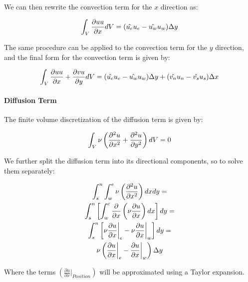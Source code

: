 We can then rewrite the convection term for the $x$ direction as:

\begin{equation}
    \int_{V} \frac{\partial u u}{\partial x} \space dV = (\hat{u_e} u_e - \hat{u_w} u_w) \Delta y
\end{equation}

The same procedure can be applied to the convection term for the $y$ direction, and the final form for the convection term is given by:

\begin{equation}
    \int_{V} \frac{\partial u u}{\partial x} + \frac{\partial v u}{\partial y} \space dV = (\hat{u_e} u_e - \hat{u_w} u_w) \Delta y + (\hat{v_n} u_n - \hat{v_s} u_s) \Delta x
    \label{eq:INS_steady_2D_discretized_convection}
\end{equation}



%
%
\paragraph{Diffusion Term}

The finite volume discretization of the diffusion term is given by:

\begin{equation}
    \int_{V} \nu \left( \frac{\partial^2 u}{\partial x^2} + \frac{\partial^2 u}{\partial y^2} \right) \space dV = 0
\end{equation}

We further split the diffusion term into its directional components, so to solve them separately:

\begin{gather}
    \int_{s}^{n} \int_{w}^{e} \nu \left( \frac{\partial^2 u}{\partial x^2} \right) \space dxdy = \\
    \int_{s}^{n} \left[ \int_{w}^{e} \frac{\partial}{\partial x} \left(\nu \frac{\partial u}{\partial x} \right) \space dx \right] dy = \\
    \int_{s}^{n} \left[ \nu \frac{\partial u}{\partial x} \bigg|_e - \nu \frac{\partial u}{\partial x} \bigg|_w \right] dy = \\
    \nu \left( \frac{\partial u}{\partial x} \bigg|_e - \frac{\partial u}{\partial x} \bigg|_w \right) \Delta y
\end{gather}

Where the terms $\left(\frac{\partial u}{\partial x} \bigg|_{Position}\right)$ will be approximated using a Taylor expansion.

